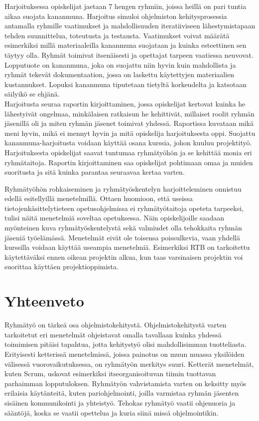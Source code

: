 \documentclass[finnish]{../tktltiki2}
\theoremstyle{definition}
\theoremstyle{remark}
\begin{document}
\begin{itemize}
Harjoituksessa opiskelijat jaetaan 7 hengen ryhmiin, joissa heillä on pari tuntia aikaa suojata kananmuna. Harjoitus simuloi ohjelmiston kehitysprosessia antamalla ryhmille vaatimukset ja mahdollisuuden iteratiiviseen lähestymistapaan tehden suunnittelua, toteutusta ja testausta. Vaatimukset voivat määrätä esimerkiksi millä materiaaleilla kananmuna suojataan ja kuinka esteettinen sen täytyy olla. Ryhmät toimivat itsenäisesti ja opettajat tarpeen vaatiessa neuvovat. Lopputuote on kananmuna, joka on suojattu niin hyvin kuin mahdollista ja ryhmät tekevät dokumentaation, jossa on laskettu käytettyjen materiaalien kustannukset. Lopuksi kananmuna tiputetaan tietyltä korkeudelta ja katsotaan säilyikö se ehjänä.\\

Harjoitusta seuraa raportin kirjoittaminen, jossa opiskelijat kertovat kuinka he lähestyivät ongelmaa, minkälaisen ratkaisun he kehittivät, millaiset roolit ryhmän jäsenillä oli ja miten ryhmän jäsenet toimivat yhdessä. Raportissa kuvataan mikä meni hyvin, mikä ei mennyt hyvin ja mitä opiskelija harjoituksesta oppi. Suojattu kananmuna-harjoitusta voidaan käyttää osana kurssia, johon kuuluu projektityö. Harjoituksesta opiskelijat saavat tuntumaa ryhmätyöhön ja se kehittää monia eri ryhmätaitoja. Raportin kirjoittaminen saa opiskelijat pohtimaan omaa ja muiden suoritusta ja sitä kuinka parantaa seuraavaa kertaa varten.

\end{itemize}

Ryhmätyöhön rohkaiseminen ja ryhmätyöskentelyn harjoitteleminen onnistuu edellä esitellyillä menetelmillä. Ottaen huomioon, että useissa tietojenkäsittelytieteen opetusohjelmissa ei ryhmätyötaitoja opeteta tarpeeksi, tulisi näitä menetelmiä soveltaa opetuksessa. Näin opiskelijoille saadaan myönteinen kuva ryhmätyöskentelystä sekä valmiudet olla tehokkaita ryhmän jäseniä työelämässä. Menetelmät eivät ole toisensa poissulkevia, vaan yhdellä kurssilla voidaan käyttää useampia menetelmiä. Esimerkiksi RTB on tarkoitettu käytettäväksi ennen oikean projektin alkua, kun taas varsinaisen projektin voi suorittaa käyttäen projektioppimista.

\section{Yhteenveto}

Ryhmätyö on tärkeä osa ohjelmistokehitystä. Ohjelmistokehitystä varten tarkoitetut eri menetelmät ohjeistavat omalla tavallaan kuinka yhdessä toimimisen pitäisi tapahtua, jotta kehitystyö olisi mahdollisimman tuotteliasta. Erityisesti ketterissä menetelmissä, joissa painotus on muun muassa yksilöiden välisessä vuorovaikutuksessa, on ryhmätyön merkitys suuri. Ketterät menetelmät, kuten Scrum, uskovat esimerkiksi itseorganisoituvan tiimin tuottavan parhaimman lopputuloksen. Ryhmätyön vahvistamista varten on keksitty myös erilaisia käytänteitä, kuten pariohjelmointi, joilla varmistaa ryhmän jäsenten sisäinen kommunikointi ja yhteistyö. Tehokas ryhmätyö vaatii ohjenuoria ja sääntöjä, koska se vaatii opettelua ja kuria siinä missä ohjelmointikin.\\
\end{document}
